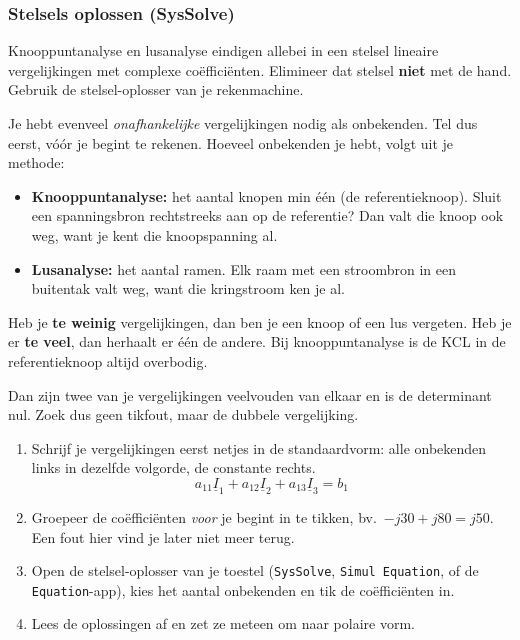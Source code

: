 \documentclass[a4paper,11pt]{article}
\begin{document}
\subsubsection*{Stelsels oplossen (SysSolve)}

Knooppuntanalyse en lusanalyse eindigen allebei in een stelsel lineaire vergelijkingen met complexe
co\"effici\"enten. Elimineer dat stelsel \textbf{niet} met de hand. Gebruik de stelsel-oplosser van
je rekenmachine.

Je hebt evenveel \emph{onafhankelijke} vergelijkingen nodig als onbekenden. Tel dus eerst, v\'o\'or je
begint te rekenen. Hoeveel onbekenden je hebt, volgt uit je methode:
\begin{itemize}
    \item \textbf{Knooppuntanalyse:} het aantal knopen min \'e\'en (de referentieknoop). Sluit een
          spanningsbron rechtstreeks aan op de referentie? Dan valt die knoop ook weg, want je kent
          die knoopspanning al.
    \item \textbf{Lusanalyse:} het aantal ramen. Elk raam met een stroombron in een buitentak valt
          weg, want die kringstroom ken je al.
\end{itemize}

Heb je \textbf{te weinig} vergelijkingen, dan ben je een knoop of een lus vergeten. Heb je er
\textbf{te veel}, dan herhaalt er \'e\'en de andere. Bij knooppuntanalyse is de KCL in de
referentieknoop altijd overbodig.

 Dan zijn twee van je
vergelijkingen veelvouden van elkaar en is de determinant nul. Zoek dus geen tikfout, maar de
dubbele vergelijking.

\begin{theorie}[Werkwijze]
    \begin{enumerate}
        \item Schrijf je vergelijkingen eerst netjes in de standaardvorm: alle onbekenden links in
              dezelfde volgorde, de constante rechts.
              \[a_{11}\underline{I}_1 + a_{12}\underline{I}_2 + a_{13}\underline{I}_3 = b_1\]
        \item Groepeer de co\"effici\"enten \emph{voor} je begint in te tikken, bv.\
              $-j30 + j80 = j50$. Een fout hier vind je later niet meer terug.
        \item Open de stelsel-oplosser van je toestel (\texttt{SysSolve}, \texttt{Simul Equation},
              of de \texttt{Equation}-app), kies het aantal onbekenden en tik de co\"effici\"enten in.
        \item Lees de oplossingen af en zet ze meteen om naar polaire vorm.
    \end{enumerate}
\end{theorie}
\end{document}
